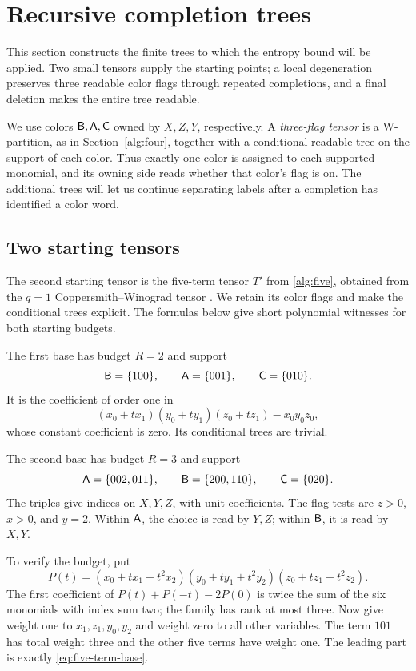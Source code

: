 \section{Recursive completion trees}\label{sec:completion}

This section constructs the finite trees to which the entropy bound
will be applied.  Two small tensors supply the starting points;
a local degeneration preserves three readable color flags through
repeated completions, and a final deletion makes the entire tree
readable.

We use colors \(\mathsf B,\mathsf A,\mathsf C\) owned by \(X,Z,Y\), respectively.
A \emph{three-flag tensor} is a W-partition, as in
Section~\ref{alg:four}, together with a conditional readable tree on
the support of each color.  Thus exactly one color is assigned to
each supported monomial, and its owning side reads whether that
color's flag is on.  The additional trees will let us continue
separating labels after a completion has identified a color word.

\subsection{Two starting tensors}

The second starting tensor is the five-term tensor \(T'\) from
\eqref{alg:five}, obtained from the \(q=1\) Coppersmith--Winograd
tensor \cite[Section~7]{cw}.  We retain its color flags and make the
conditional trees explicit.  The formulas below give short polynomial
witnesses for both starting budgets.

The first base has budget \(R=2\) and support
\[
 \mathsf B=\{100\},\qquad \mathsf A=\{001\},\qquad \mathsf C=\{010\}.
\]
It is the coefficient of order one in
\[
 (x_0+t x_1)(y_0+t y_1)(z_0+t z_1)-x_0y_0z_0,
\]
whose constant coefficient is zero.
Its conditional trees are trivial.

The second base has budget \(R=3\) and support
\begin{equation}\label{eq:five-term-base}
 \mathsf A=\{002,011\},\qquad
 \mathsf B=\{200,110\},\qquad
 \mathsf C=\{020\}.
\end{equation}
The triples give indices on \(X,Y,Z\), with unit coefficients.
The flag tests are \(z>0\), \(x>0\), and \(y=2\).
Within \(\mathsf A\), the choice is read by \(Y,Z\); within \(\mathsf B\),
it is read by \(X,Y\).

To verify the budget, put
\[
 P(t)=(x_0+t x_1+t^2x_2)
      (y_0+t y_1+t^2y_2)
      (z_0+t z_1+t^2z_2).
\]
The first coefficient of
\(P(t)+P(-t)-2P(0)\) is twice the sum of the six monomials with
index sum two; the family has rank at most three.
Now give weight one to \(x_1,z_1,y_0,y_2\) and weight zero to all
other variables.
The term \(101\) has total weight three and the other five terms
have weight one.
The leading part is exactly \eqref{eq:five-term-base}.

